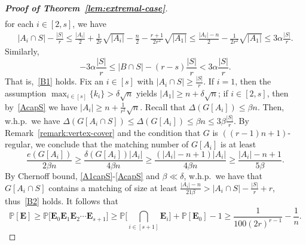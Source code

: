 \documentclass[11pt, a4paper]{article}
\theoremstyle{definition}
\newcommand{\<}{\subseteq}
\begin{document}
\begin{proof}[{\bf Proof of Theorem~\ref{lem:extremal-case}}]
\begin{align}
\end{align}
for each $i\in [2,s]$, we have 
\begin{align}\label{AcapS}
|A_i\cap S|-\frac{|S|}{r}\le\frac{|A_i|}{2}+\frac{1}{2r}\sqrt{|A_i|}-\frac{n}{2}-\frac{r+1}{2r^2}\sqrt{|A_1|}\leq \frac{|A_i|-n}{2}-\frac{1}{2r^2}\sqrt{|A_1|}\leq 3\alpha \frac{|S|}{r}.
\end{align}
Similarly, 
\[
-3\alpha \frac{|S|}{r}\leq |B\cap S|-{(r-s)\frac{|S|}{r}}<3\alpha \frac{|S|}{r}.
\]
That is,~\ref{B1} holds. Fix an $i\in [s]$ with $|A_i\cap S|\geq \frac{|S|}{r}$. If \(i=1\), then the assumption \(\max_{i\in[s]}\{k_i\} > \delta\sqrt{n}\) yields \(|A_1|\ge n+\delta\sqrt{n}\);  if \(i\in[2,s]\), then by~\eqref{AcapS} we have \(|A_i|\ge n+\frac{1}{r^2}\sqrt{n}\). %
Recall that $\Delta(G[A_i])\leq \beta n$. Then, w.h.p.~we have $\Delta(G[A_i\cap S])\leq \Delta(G[A_i])\leq \beta n\leq 3\beta \frac{|S|}{r}$.  By Remark~\ref{remark:vertex-cover} and {the condition that} $G$ is $((r-1)n+1)$-regular, we conclude that the matching number of $G[A_i]$ is at least $$\frac{e(G[A_i])}{2\beta n}\geq \frac{\delta(G[A_i])|A_i|}{4\beta n}\geq \frac{(|A_i|-n+1)|A_i|}{4\beta n}\geq \frac{|A_i|-n+1}{5\beta}.$$ 
By Chernoff bound, {\eqref{A1capS}-\eqref{AcapS} and $\beta\ll \delta$}, w.h.p.~we have that $G[A_i\cap S]$ contains a matching of size at least $\frac{|A_i|-n}{21\beta}>|A_i\cap S|-\frac{|S|}{r}+r$, thus~\ref{B2} holds.
It follows that  $${\mathbb{P}[\mathbf{E}]\geq \mathbb{P}\big[\mathbf{E}_0\mathbf{E}_1\mathbf{E}_2\cdots\mathbf{E}_{s+1} \big]\geq\mathbb{P}\Big[{\bigcap_{i\in [s+1]}\mathbf{E}_i }\Big]+%
\mathbb{P}[\mathbf{E}_0 ]-1\ge \frac{1}{100(2r)^{r-1}}-\frac{1}{n}.}
$$ 



\end{proof}
\end{document}
